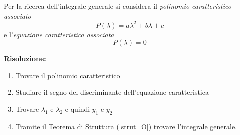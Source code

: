 Per la ricerca dell'integrale generale si considera il \emph{polinomio caratteristico associato}
\begin{equation}
    P(\lambda) = a \lambda^2 + b \lambda + c
\end{equation}
e l'\emph{equazione caratteristica associata}
\begin{equation}
    P(\lambda) = 0
\end{equation}

\underline{\textbf{Risoluzione:}}
\begin{enumerate}
    \item Trovare il polinomio caratteristico
    \item Studiare il segno del discriminante dell'equazione caratteristica
    \item Trovare $\lambda_1$ e $\lambda_2$ e quindi $y_1$ e $y_2$
    \item Tramite il Teorema di Struttura (\ref{strut_O}) trovare l'integrale generale.
\end{enumerate}

